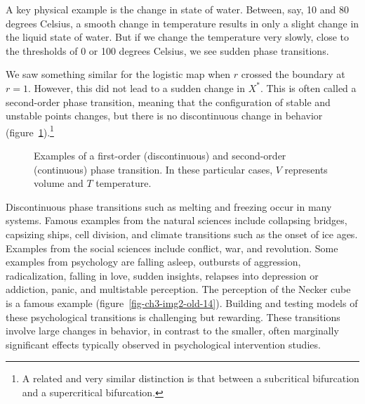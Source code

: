 \documentclass[
  a4paper,
  DIV=11,
  numbers=noendperiod,
  oneside]{scrreprt}
\begin{document}
A key physical example is the change in state of water. Between, say, 10
and 80 degrees Celsius, a smooth change in temperature results in only a
slight change in the liquid state of water. But if we change the
temperature very slowly, close to the thresholds of 0 or 100 degrees
Celsius, we see sudden phase transitions.

We saw something similar for the logistic map when \(r\) crossed the
boundary at \(r = 1\). However, this did not lead to a sudden change in
\(X^{*}\). This is often called a second-order phase transition, meaning
that the configuration of stable and unstable points changes, but there
is no discontinuous change in behavior
(figure~\ref{fig-ch3-img1-old-13}).\footnote{A related and very similar
  distinction is that between a subcritical bifurcation and a
  supercritical bifurcation.}

\begin{figure}


\caption{\label{fig-ch3-img1-old-13}Examples of a first-order
(discontinuous) and second-order (continuous) phase transition. In these
particular cases, \(V\) represents volume and \(T\) temperature.}

\end{figure}%

Discontinuous phase transitions such as melting and freezing occur in
many systems. Famous examples from the natural sciences include
collapsing bridges, capsizing ships, cell division, and climate
transitions such as the onset of ice ages. Examples from the social
sciences include conflict, war, and revolution. Some examples from
psychology are falling asleep, outbursts of aggression, radicalization,
falling in love, sudden insights, relapses into depression or addiction,
panic, and multistable perception. The perception of the Necker cube is
a famous example (figure~\ref{fig-ch3-img2-old-14}). Building and
testing models of these psychological transitions is challenging but
rewarding. These transitions involve large changes in behavior, in
contrast to the smaller, often marginally significant effects typically
observed in psychological intervention studies.
\end{document}
